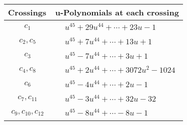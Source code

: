 \documentclass[1p]{elsarticle_modified}
\theoremstyle{definition}
\begin{document}
\begin{tabular}{m{50pt}|m{274pt}}
Crossings & \hspace{64pt}u-Polynomials at each crossing \\
\hline $$\begin{aligned}c_{1}\end{aligned}$$&$\begin{aligned}
&u^{45}+29 u^{44}+\cdots+23 u-1
\end{aligned}$\\
\hline $$\begin{aligned}c_{2},c_{5}\end{aligned}$$&$\begin{aligned}
&u^{45}+7 u^{44}+\cdots+13 u+1
\end{aligned}$\\
\hline $$\begin{aligned}c_{3}\end{aligned}$$&$\begin{aligned}
&u^{45}-7 u^{44}+\cdots+3 u+1
\end{aligned}$\\
\hline $$\begin{aligned}c_{4},c_{8}\end{aligned}$$&$\begin{aligned}
&u^{45}+2 u^{44}+\cdots+3072 u^2-1024
\end{aligned}$\\
\hline $$\begin{aligned}c_{6}\end{aligned}$$&$\begin{aligned}
&u^{45}-4 u^{44}+\cdots+2 u-1
\end{aligned}$\\
\hline $$\begin{aligned}c_{7},c_{11}\end{aligned}$$&$\begin{aligned}
&u^{45}-3 u^{44}+\cdots+32 u-32
\end{aligned}$\\
\hline $$\begin{aligned}c_{9},c_{10},c_{12}\end{aligned}$$&$\begin{aligned}
&u^{45}-8 u^{44}+\cdots-8 u-1
\end{aligned}$\\
\hline
\end{tabular}\\~\\
\newpage\renewcommand{\arraystretch}{1}
\end{document}
